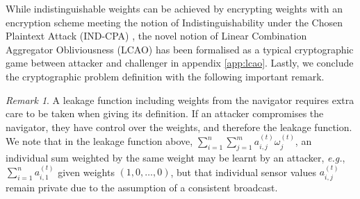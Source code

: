\documentclass[10pt,letterpaper,oneside,twocolumn,journal]{IEEEtran}
\theoremstyle{definition}
\theoremstyle{definition}
\theoremstyle{remark}
\newtheorem*{remark}{Remark}
\begin{document}
While indistinguishable weights can be achieved by encrypting weights with an encryption scheme meeting the notion of Indistinguishability under the Chosen Plaintext Attack (IND-CPA) \cite{katzIntroductionModernCryptography2008}, the novel notion of Linear Combination Aggregator Obliviousness (LCAO) has been formalised as a typical cryptographic game between attacker and challenger in appendix \ref{app:lcao}. Lastly, we conclude the cryptographic problem definition with the following important remark.
\begin{remark}
    A leakage function including weights from the navigator requires extra care to be taken when giving its definition. If an attacker compromises the navigator, they have control over the weights, and therefore the leakage function. We note that in the leakage function above, $\sum^n_{i=1}\sum^m_{j=1}a^{(t)}_{i,j}\omega^{(t)}_j$, an individual sum weighted by the same weight may be learnt by an attacker, \textit{e.g.}, $\sum^n_{i=1}a^{(t)}_{i,1}$ given weights $(1,0,\dots,0)$, but that individual sensor values $a^{(t)}_{i,j}$ remain private due to the assumption of a consistent broadcast.
\end{remark}

% 
% 
\end{document}
